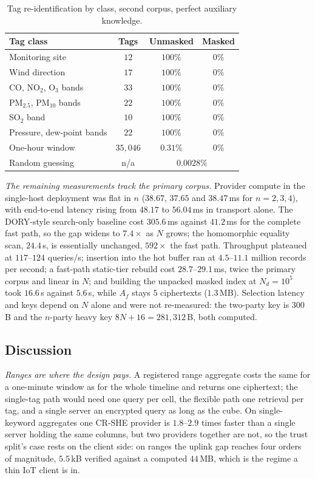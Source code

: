 \documentclass[a4paper,fleqn]{cas-sc}
\begin{document}
\begin{table}[pos=htbp]
\caption{Tag re-identification by class, second corpus, perfect auxiliary
knowledge.}
\label{tab:leakagebeijing}
\centering
\footnotesize
\setlength{\tabcolsep}{3pt}
\begin{tabular*}{\tblwidth}{@{\extracolsep{\fill}}lccc@{}}
\toprule
Tag class & Tags & Unmasked & Masked \\
\midrule
Monitoring site        & $12$       & $100\%$   & $0\%$ \\
Wind direction         & $17$       & $100\%$   & $0\%$ \\
CO, NO$_2$, O$_3$ bands & $33$      & $100\%$   & $0\%$ \\
PM$_{2.5}$, PM$_{10}$ bands & $22$  & $100\%$   & $0\%$ \\
SO$_2$ band            & $10$       & $100\%$   & $0\%$ \\
Pressure, dew-point bands & $22$    & $100\%$   & $0\%$ \\
One-hour window        & $35{,}046$ & $0.31\%$  & $0\%$ \\
\midrule
Random guessing        & n/a        & \multicolumn{2}{c}{$0.0028\%$} \\
\bottomrule
\end{tabular*}
\end{table}

\emph{The remaining measurements track the primary corpus.} Provider compute
in the single-host deployment was flat in $n$ ($38.67$, $37.65$ and
$38.47$\,ms for $n=2,3,4$), with end-to-end latency rising from $48.17$ to
$56.04$\,ms in transport alone. The DORY-style search-only baseline cost
$305.6$\,ms against $41.2$\,ms for the complete fast path, so the gap widens to
$7.4\times$ as $N$ grows; the homomorphic equality scan, $24.4$\,s, is
essentially unchanged, $592\times$ the fast path. Throughput plateaued at
$117$--$124$ queries/s; insertion into the hot buffer ran at $4.5$--$11.1$
million records per second; a fast-path static-tier rebuild cost
$28.7$--$29.1$\,ms, twice the primary corpus and linear in $N$; and building
the unpacked masked index at $N_d=10^5$ took $16.6$\,s against $5.6$\,s, while
$A_f$ stays $5$ ciphertexts ($1.3$\,MB). Selection latency and keys depend on
$N$ alone and were not re-measured: the two-party key is $300$\,B and the
$n$-party heavy key $8N+16=281{,}312$\,B, both computed.

\subsection{Discussion}
\emph{Ranges are where the design pays.} A registered range aggregate costs the
same for a one-minute window as for the whole timeline and returns one
ciphertext; the single-tag path would need one query per cell, the flexible
path one retrieval per tag, and a single server an encrypted query as long as
the cube. On single-keyword aggregates one CR-SHE provider is $1.8$--$2.9$
times faster than a single server holding the same columns, but two providers
together are not, so the trust split's case rests on the client side: on
ranges the uplink gap reaches four orders of magnitude, $5.5$\,kB verified
against a computed $44$\,MB, which is the regime a thin IoT client is in.
\end{document}
